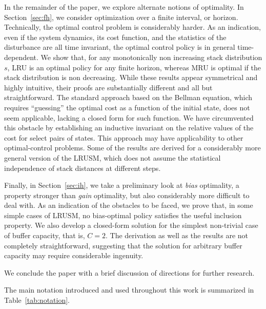 \documentclass[11pt,a4paper]{article}
\theoremstyle{definition}
\theoremstyle{remark}
\begin{document}
In the remainder of the paper, we explore alternate notions of
optimality. In Section~\ref{sec:fh}, we consider optimization over a
finite interval, or horizon.  Technically, the optimal control problem
is considerably harder. As an indication, even if the system dynamics,
its cost function, and the statistics of the disturbance are all time
invariant, the optimal control policy is in general time-dependent.
We show that, for any monotonically non increasing stack distribution
$s$, LRU is an optimal policy for any finite horizon, whereas MRU is
optimal if the stack distribution is non decreasing.  While these
results appear symmetrical and highly intuitive, their proofs are
substantially different and all but straightforward.  The standard
approach based on the Bellman equation, which requires ``guessing''
the optimal cost as a function of the initial state, does not seem
applicable, lacking a closed form for such function. We have
circumvented this obstacle by establishing an inductive invariant on
the relative values of the cost for select pairs of states. This
approach may have applicability to other optimal-control problems.
Some of the results are derived for a considerably more general
version of the LRUSM, which does not assume the statistical
independence of stack distances at different steps.

Finally, in Section~\ref{sec:ih}, we take a preliminary look at 
\emph{bias} optimality, a property stronger than \emph{gain} optimality,
but also considerably more difficult to deal with. As an indication of
the obstacles to be faced, we prove that, in some simple cases of
LRUSM, no bias-optimal policy satisfies the useful inclusion property.
We also develop a closed-form solution for the simplest non-trivial
case of buffer capacity, that is, $C=2$.  The derivation as well as
the results are not completely straightforward, suggesting that the
solution for arbitrary buffer capacity may require considerable
ingenuity.

We conclude the paper with a brief discussion of directions for
further research.

The main notation introduced and used throughout this work is summarized in
Table~\ref{tab:notation}.
\end{document}
